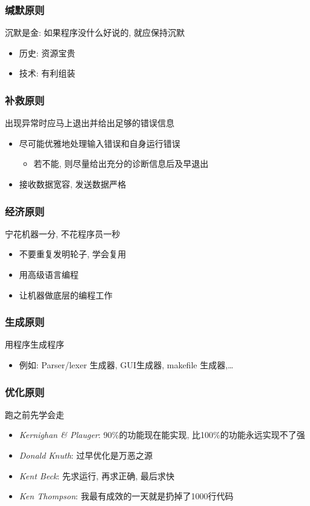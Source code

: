 \documentclass[compress]{beamer}
\begin{document}
\begin{frame}
\frametitle{缄默原则}
沉默是金: 如果程序没什么好说的, 就应保持沉默

\begin{itemize}
\item 历史: 资源宝贵
\item 技术: 有利组装
\end{itemize}
\end{frame}

\begin{frame}
\frametitle{补救原则}
{出现异常时应马上退出并给出足够的错误信息 }

\begin{itemize}
  \item 尽可能优雅地处理输入错误和自身运行错误
	\begin{itemize}
	  \item 若不能, 则尽量给出充分的诊断信息后及早退出
	\end{itemize}
  \item 接收数据宽容, 发送数据严格
\end{itemize}
\end{frame}

\begin{frame}
\frametitle{经济原则}
\begin{block}{宁花机器一分, 不花程序员一秒}
\begin{itemize}
  \item 不要重复发明轮子, 学会复用
  \item 用高级语言编程
  \item 让机器做底层的编程工作
\end{itemize}
\end{block}
\end{frame}

\begin{frame}
\frametitle{生成原则}
用程序生成程序
\begin{itemize}
\item 例如: Parser/lexer 生成器, GUI生成器,  makefile 生成器,\ldots
\end{itemize}

\end{frame}

\begin{frame}
\frametitle{优化原则}
\begin{block}{跑之前先学会走}
\begin{itemize}
\item \textit{Kernighan \& Plauger}: 90\%的功能现在能实现, 
  比100\%的功能永远实现不了强 

\item \textit{Donald Knuth}: 过早优化是万恶之源 

\item \textit{Kent Beck}: 先求运行, 再求正确, 最后求快

\item \textit{Ken Thompson}: 我最有成效的一天就是扔掉了1000行代码
\end{itemize}
\end{block}

\end{frame}
\end{document}
